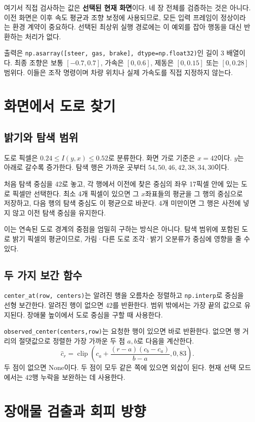 \documentclass[11pt,a4paper]{article}
\newcommand{\code}[1]{{\small\nolinkurl{#1}}}
\newcommand{\clip}{\operatorname{clip}}
\begin{document}
여기서 직접 검사하는 값은 \textbf{선택된 현재 화면}이다. 네 장 전체를 검증하는 것은 아니다. 이전 화면은 이후 속도 평균과 조향 보정에 사용되므로, 모든 입력 프레임이 정상이라는 환경 계약이 중요하다. 선택된 최상위 실행 경로에는 이 예외를 잡아 행동을 대신 반환하는 처리가 없다.

출력은 \code{np.asarray([steer, gas, brake], dtype=np.float32)}인 길이 3 배열이다. 최종 조향은 보통 $[-0.7,0.7]$, 가속은 $[0,0.6]$, 제동은 $[0,0.15]$ 또는 $[0,0.28]$ 범위다. 이들은 조작 명령이며 차량 위치나 실제 가속도를 직접 지정하지 않는다.

\section{화면에서 도로 찾기}
\subsection{밝기와 탐색 범위}
도로 픽셀은 $0.24\le I(y,x)\le0.52$로 분류한다. 화면 가로 기준은 $x=42$이다. $y$는 아래로 갈수록 증가한다. 탐색 행은 가까운 곳부터 $54,50,46,42,38,34,30$이다.

처음 탐색 중심을 42로 놓고, 각 행에서 이전에 찾은 중심의 좌우 17픽셀 안에 있는 도로 픽셀만 선택한다. 최소 4개 픽셀이 있으면 그 $x$좌표들의 평균을 그 행의 중심으로 저장하고, 다음 행의 탐색 중심도 이 평균으로 바꾼다. 4개 미만이면 그 행은 사전에 넣지 않고 이전 탐색 중심을 유지한다.

이는 연속된 도로 경계의 중점을 엄밀히 구하는 방식은 아니다. 탐색 범위에 포함된 도로 밝기 픽셀의 평균이므로, 가림·다른 도로 조각·밝기 오분류가 중심에 영향을 줄 수 있다.

\subsection{두 가지 보간 함수}
\code{center_at(row, centers)}는 알려진 행을 오름차순 정렬하고 \code{np.interp}로 중심을 선형 보간한다. 알려진 행이 없으면 42를 반환한다. 범위 밖에서는 가장 끝의 값으로 유지된다. 장애물 높이에서 도로 중심을 구할 때 사용한다.

\code{observed_center(centers,row)}는 요청한 행이 있으면 바로 반환한다. 없으면 행 거리의 절댓값으로 정렬한 가장 가까운 두 점 $a,b$로 다음을 계산한다.
\[
 \hat c_r=\clip\left(c_a+\frac{(r-a)(c_b-c_a)}{b-a},0,83\right).
\]
두 점이 없으면 None이다. 두 점이 모두 같은 쪽에 있으면 외삽이 된다. 현재 선택 모드에서는 42행 누락을 보완하는 데 사용한다.

\section{장애물 검출과 회피 방향}
\end{document}
